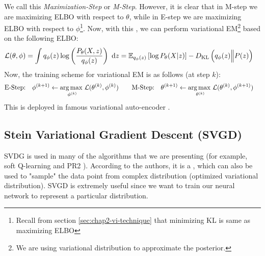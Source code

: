 We call this \textit{Maximization-Step} or \textit{M-Step}. However, it is clear that in M-step we are maximizing ELBO with respect to $\theta$, while in E-step we are maximizing ELBO with respect to $\phi$\footnote{Recall from section \ref{sec:chap2-vi-technique} that minimizing KL is same as maximizing ELBO}. Now, with this , we can perform variational EM\footnote{We are using variational distribution to approximate the posterior.} based on the following ELBO:
\begin{equation}
    \begin{aligned}
        \mathcal{L}(\theta, \phi) &= \int q_{\phi}(z) \log \left( \frac{P_{\theta}(X, z)}{q_{\phi}(z)} \right) \ \mathrm{d} z
        = \mathbb{E}_{q_{\phi}(z)} \left[ \log P_{\theta}(X | z) \right] - D_{\mathrm{KL}}\left( q_{\phi}(z) \Big\| P(z) \right)
    \end{aligned}
\end{equation}
Now, the training scheme for variational EM is as follows (at step $k$):
\begin{equation}
    \begin{aligned}
        &\text{E-Step:} \quad \phi^{(k+1)} \leftarrow \underset{\phi^{(k)}}{\arg\max \ }\mathcal{L}(\theta^{(k)}, \phi^{(k)}) \qquad \text{M-Step:} \quad \theta^{(k+1)} \leftarrow \underset{\theta^{(k)}}{\arg\max \ }\mathcal{L}(\theta^{(k)}, \phi^{(k+1)})
    \end{aligned}
\end{equation}
This is deployed in famous variational auto-encoder \cite{kingma2013auto}.

\subsection{Stein Variational Gradient Descent (SVGD) \cite{liu2016stein}}
\label{sec:chap2-svgd}
SVDG is used in many of the algorithms that we are presenting (for example, soft Q-learning \cite{haarnoja2017reinforcement} and PR2 \cite{wen2019probabilistic}). According to the authors, it is a  \cite{liu2016stein}, which can also be used to "sample" the data point from complex distribution (optimized variational distribution). SVGD is extremely useful since we want to train our neural network to represent a particular distribution. 


